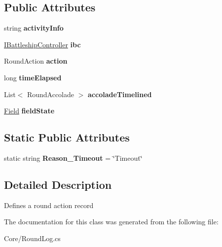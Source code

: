 \subsection*{Public Attributes}
\begin{DoxyCompactItemize}
\item 
\hypertarget{class_m_b_c_1_1_core_1_1_round_log_1_1_round_activity_a93245160332d9eba203f366e9f6c7b40}{string {\bfseries activity\-Info}}\label{class_m_b_c_1_1_core_1_1_round_log_1_1_round_activity_a93245160332d9eba203f366e9f6c7b40}

\item 
\hypertarget{class_m_b_c_1_1_core_1_1_round_log_1_1_round_activity_a792bfde63fceba78ab5551a37618eca1}{\hyperlink{interface_m_b_c_1_1_core_1_1_i_battleship_controller}{I\-Battleship\-Controller} {\bfseries ibc}}\label{class_m_b_c_1_1_core_1_1_round_log_1_1_round_activity_a792bfde63fceba78ab5551a37618eca1}

\item 
\hypertarget{class_m_b_c_1_1_core_1_1_round_log_1_1_round_activity_af5aa39bdbfc08d5d91d1e78778169390}{Round\-Action {\bfseries action}}\label{class_m_b_c_1_1_core_1_1_round_log_1_1_round_activity_af5aa39bdbfc08d5d91d1e78778169390}

\item 
\hypertarget{class_m_b_c_1_1_core_1_1_round_log_1_1_round_activity_a41e76ac7f84c694a03a2d6deae2dd2e5}{long {\bfseries time\-Elapsed}}\label{class_m_b_c_1_1_core_1_1_round_log_1_1_round_activity_a41e76ac7f84c694a03a2d6deae2dd2e5}

\item 
\hypertarget{class_m_b_c_1_1_core_1_1_round_log_1_1_round_activity_ac8200bb672e193945d5cac7ad3bcfd5c}{List$<$ Round\-Accolade $>$ {\bfseries accolade\-Timelined}}\label{class_m_b_c_1_1_core_1_1_round_log_1_1_round_activity_ac8200bb672e193945d5cac7ad3bcfd5c}

\item 
\hypertarget{class_m_b_c_1_1_core_1_1_round_log_1_1_round_activity_a007bff7b101c4416edae38eaa7590c71}{\hyperlink{class_m_b_c_1_1_core_1_1_field}{Field} {\bfseries field\-State}}\label{class_m_b_c_1_1_core_1_1_round_log_1_1_round_activity_a007bff7b101c4416edae38eaa7590c71}

\end{DoxyCompactItemize}
\subsection*{Static Public Attributes}
\begin{DoxyCompactItemize}
\item 
\hypertarget{class_m_b_c_1_1_core_1_1_round_log_1_1_round_activity_af8458e6721eb85d6155a1fc5d81beb6d}{static string {\bfseries Reason\-\_\-\-Timeout} = \char`\"{}Timeout\char`\"{}}\label{class_m_b_c_1_1_core_1_1_round_log_1_1_round_activity_af8458e6721eb85d6155a1fc5d81beb6d}

\end{DoxyCompactItemize}


\subsection{Detailed Description}
Defines a round action record

The documentation for this class was generated from the following file\-:\begin{DoxyCompactItemize}
\item 
Core/Round\-Log.\-cs\end{DoxyCompactItemize}
